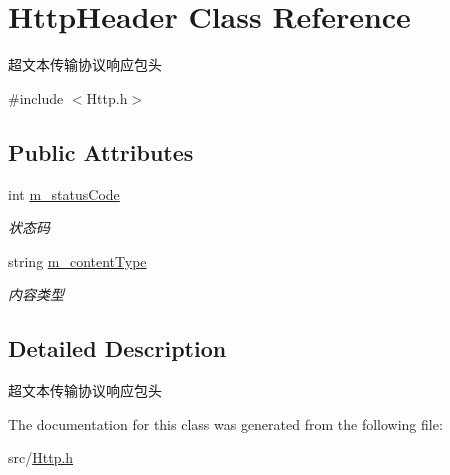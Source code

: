 \hypertarget{class_http_header}{}\section{Http\+Header Class Reference}
\label{class_http_header}


超文本传输协议响应包头  




{\ttfamily \#include $<$Http.\+h$>$}

\subsection*{Public Attributes}
\begin{DoxyCompactItemize}
\item 
\mbox{\label{class_http_header_af12a581280636bfd124fb0c9170ca509}} 
int \hyperlink{class_http_header_af12a581280636bfd124fb0c9170ca509}{m\+\_\+status\+Code}
\begin{DoxyCompactList}\small\item\em 状态码 \end{DoxyCompactList}\item 
\mbox{\label{class_http_header_a5a0a7a47c6053bb5f81873dbb5899f56}} 
string \hyperlink{class_http_header_a5a0a7a47c6053bb5f81873dbb5899f56}{m\+\_\+content\+Type}
\begin{DoxyCompactList}\small\item\em 内容类型 \end{DoxyCompactList}\end{DoxyCompactItemize}


\subsection{Detailed Description}
超文本传输协议响应包头 

The documentation for this class was generated from the following file\+:\begin{DoxyCompactItemize}
\item 
src/\hyperlink{_http_8h}{Http.\+h}\end{DoxyCompactItemize}
